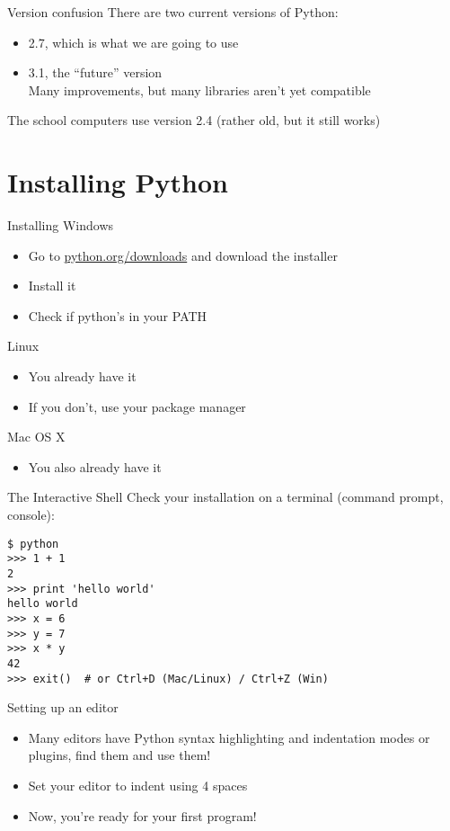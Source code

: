 \documentclass{pyslides}
\begin{document}
\begin{frame}{Version confusion}
There are two current versions of Python:
\begin{itemize}
\item 2.7, which is what we are going to use
\item 3.1, the “future” version \\ {\small Many improvements, but many libraries aren't yet compatible}
\end{itemize}
The school computers use version 2.4 {\small (rather old, but it still works)}

\end{frame}

\section{Installing Python}

\begin{frame}{Installing}
Windows
\begin{itemize}
\item Go to \href{http://python.org/downloads}{python.org/downloads} and download the installer
\item Install it
\item Check if python's in your PATH
\end{itemize}
Linux
\begin{itemize}
\item You already have it
\item If you don't, use your package manager
\end{itemize}
Mac OS X
\begin{itemize}
\item You also already have it
\end{itemize}
\bigskip
\end{frame}

\begin{frame}[fragile]{The Interactive Shell}
Check your installation on a terminal (command prompt, console):
\begin{verbatim}$ python
>>> 1 + 1
2
>>> print 'hello world'
hello world
>>> x = 6
>>> y = 7
>>> x * y
42
>>> exit()  # or Ctrl+D (Mac/Linux) / Ctrl+Z (Win)\end{verbatim}
\end{frame}

\begin{frame}{Setting up an editor}
\begin{itemize}
\item Many editors have Python syntax highlighting and indentation modes or plugins, find them and use them!
\item Set your editor to indent using 4 spaces
\bigskip
\item Now, you're ready for your first program!
\end{itemize}
\end{frame}
\end{document}
